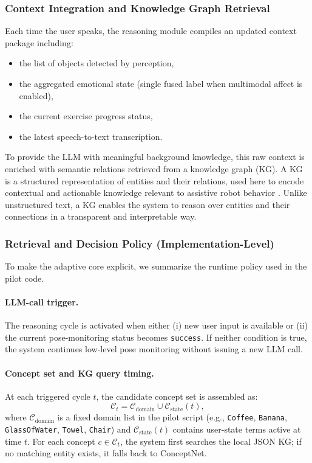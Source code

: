 \documentclass[pdflatex,sn-basic,Numbered,iicol,twocolumn]{sn-jnl}%
\begin{document}
\subsubsection{Context Integration and Knowledge Graph Retrieval}

Each time the user speaks, the reasoning module compiles an updated context package including:
\begin{itemize}
\item the list of objects detected by perception,
\item the aggregated emotional state (single fused label when multimodal affect is enabled),
\item the current exercise progress status,
\item the latest speech-to-text transcription.
\end{itemize}

To provide the LLM with meaningful background knowledge, this raw context is enriched with semantic relations retrieved from a knowledge graph (KG). A KG is a structured representation of entities and their relations, used here to encode contextual and actionable knowledge relevant to assistive robot behavior \cite{Hogan2021,Speer2017}. Unlike unstructured text, a KG enables the system to reason over entities and their connections in a transparent and interpretable way.

\subsubsection{Retrieval and Decision Policy (Implementation-Level)}

To make the adaptive core explicit, we summarize the runtime policy used in the pilot code.

\paragraph{LLM-call trigger.}
The reasoning cycle is activated when either (i) new user input is available or (ii) the current pose-monitoring status becomes \texttt{success}. If neither condition is true, the system continues low-level pose monitoring without issuing a new LLM call.

\paragraph{Concept set and KG query timing.}
At each triggered cycle $t$, the candidate concept set is assembled as:
\begin{equation}
\mathcal{C}_t = \mathcal{C}_{\text{domain}} \cup \mathcal{C}_{\text{state}}(t),
\label{eq:concept_set}
\end{equation}
where $\mathcal{C}_{\text{domain}}$ is a fixed domain list in the pilot script (e.g., \texttt{Coffee}, \texttt{Banana}, \texttt{GlassOfWater}, \texttt{Towel}, \texttt{Chair}) and $\mathcal{C}_{\text{state}}(t)$ contains user-state terms active at time $t$. For each concept $c \in \mathcal{C}_t$, the system first searches the local JSON KG; if no matching entity exists, it falls back to ConceptNet.
\end{document}
